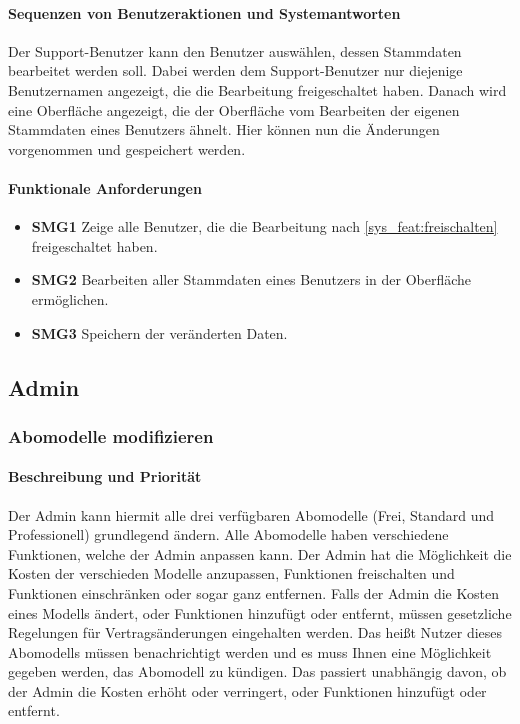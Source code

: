 \paragraph{Sequenzen von Benutzeraktionen und Systemantworten}
Der Support-Benutzer kann den Benutzer auswählen, dessen Stammdaten bearbeitet werden soll. Dabei werden dem Support-Benutzer nur diejenige Benutzernamen angezeigt, die die Bearbeitung freigeschaltet haben. Danach wird eine Oberfläche angezeigt, die der Oberfläche vom Bearbeiten der eigenen Stammdaten eines Benutzers ähnelt. Hier können nun die Änderungen vorgenommen und gespeichert werden.
\paragraph{Funktionale Anforderungen}
\begin{itemize}
	\item \textbf{SMG1} Zeige alle Benutzer, die die Bearbeitung nach \ref{sys_feat:freischalten} freigeschaltet haben.
	\item \textbf{SMG2} Bearbeiten aller Stammdaten eines Benutzers in der Oberfläche ermöglichen.
	\item \textbf{SMG3} Speichern der veränderten Daten.
\end{itemize}

\subsection{Admin}
\subsubsection{Abomodelle modifizieren}
\paragraph{Beschreibung und Priorität}
Der Admin kann hiermit alle drei verfügbaren Abomodelle (Frei, Standard und Professionell) grundlegend ändern. Alle Abomodelle haben verschiedene Funktionen, welche der Admin anpassen kann. Der Admin hat die Möglichkeit die Kosten der verschieden Modelle anzupassen, Funktionen freischalten und Funktionen einschränken oder sogar ganz entfernen. Falls der Admin die Kosten eines Modells ändert, oder Funktionen hinzufügt oder entfernt, müssen gesetzliche Regelungen für Vertragsänderungen eingehalten werden. Das heißt Nutzer dieses Abomodells müssen benachrichtigt werden und es muss Ihnen eine Möglichkeit gegeben werden, das Abomodell zu kündigen. Das passiert unabhängig davon, ob der Admin die Kosten erhöht oder verringert, oder Funktionen hinzufügt oder entfernt.
